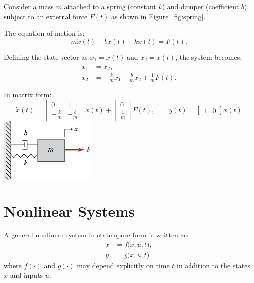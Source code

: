\begin{example}
    Consider a mass $m$ attached to a spring (constant $k$) and damper (coefficient $b$), 
    subject to an external force $F(t)$ as shown in Figure~\ref{fig:spring}.
    
The equation of motion is:
\begin{equation}
        m\ddot{x}(t) + b\dot{x}(t) + kx(t) = F(t).
\end{equation}

Defining the state vector as $x_1 = x(t)$ and $x_2 = \dot{x}(t)$, the system becomes:
\begin{align}
    \dot{x}_1 &= x_2, \\
    \dot{x}_2 &= -\tfrac{k}{m}x_1 - \tfrac{b}{m}x_2 + \tfrac{1}{m}F(t).
\end{align}

In matrix form:
\begin{equation}
\boxed{
\dot{x}(t) =
\begin{bmatrix}
0 & 1 \\
-\tfrac{k}{m} & -\tfrac{b}{m}
\end{bmatrix} x(t) +
\begin{bmatrix}
0 \\ \tfrac{1}{m}
\end{bmatrix} F(t),
\qquad
y(t) =
\begin{bmatrix}
1 & 0
\end{bmatrix} x(t)
}
\end{equation}
\centering
\includegraphics[width=0.35\textwidth]{Images/nonlinear/introduction/mass_spring_damper.jpg}
\label{fig:spring}
\end{example}

\section{Nonlinear Systems}
\begin{definition}
A general nonlinear system in state-space form is written as:
\begin{align}
    \dot{x} &= f\big(x,u,t\big), \\
    y &= g\big(x,u,t\big)
\end{align}
where $f(\cdot)$ and $g(\cdot)$ may depend explicitly on time $t$ in addition to the states $x$ and inputs $u$.
\end{definition}

